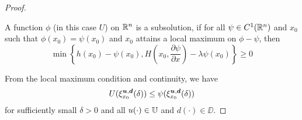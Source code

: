 \begin{for_journal}
\begin{proof}
\begin{definition} A function $\phi$ (in this case $U$) on $\mathbb{R}^n$  is a subsolution, if for all $\psi \in C^1(\mathbb{R}^n)$ and $x_0$ such that $\phi(x_0) = \psi(x_0)$ and $x_0$ attains a local maximum on $\phi- \psi$, then
%
\begin{equation}\label{eq:sub_sol}
    \min\left\{h(x_0)-\psi(x_0), H(x_0,\frac{\partial \psi}{\partial x}) - \lambda \psi(x_0)\right\} \geq 0
\end{equation}
\end{definition}
%
From the local maximum condition and continuity, we have
%
\begin{equation*}
U(\xi_{x_0}^{\bm{u}, \bm{d}}(\delta)) \leq \psi(\xi_{x_0}^{\bm{u}, \bm{d}}(\delta))
\end{equation*}
%
for sufficiently small $\delta>0$ and all $u(\cdot) \in \mathbb{U}$ and $d(\cdot) \in \DD$.


\end{proof}
\end{for_journal}
